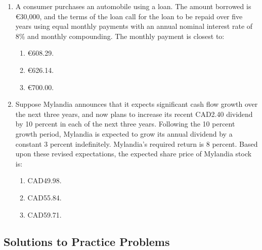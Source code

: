 \begin{enumerate}
	\item A consumer purchases an automobile using a loan. The amount borrowed is €30,000, and the terms of the loan call for the loan to be repaid over five years using equal monthly payments with an annual nominal interest rate of 8\% and monthly compounding. The monthly payment is closest to:
	      \begin{enumerate}[label=\Alph*.]
		      \item €608.29.
		      \item €626.14.
		      \item €700.00.
	      \end{enumerate}

	\item Suppose Mylandia announces that it expects significant cash flow growth over the next three years, and now plans to increase its recent CAD2.40 dividend by 10 percent in each of the next three years. Following the 10 percent growth period, Mylandia is expected to grow its annual dividend by a constant 3 percent indefinitely. Mylandia’s required return is 8 percent. Based upon these revised expectations, the expected share price of Mylandia stock is:
	      \begin{enumerate}[label=\Alph*.]
		      \item CAD49.98.
		      \item CAD55.84.
		      \item CAD59.71.
	      \end{enumerate}
\end{enumerate}

\subsection{Solutions to Practice Problems}
\label{subsec:app_Solutions_M4}

